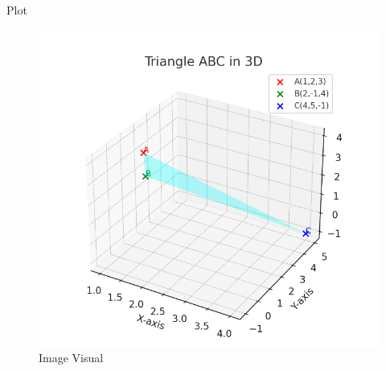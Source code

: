 \documentclass{beamer}
\begin{document}
\begin{frame}{Plot}
    \begin{figure}[H]
    \centering
    \includegraphics[width=0.5\linewidth]{figs/image.png}
    \caption{Image Visual}
    \label{fig:figs/image.png}
\end{figure}
\end{frame}
\end{document}

